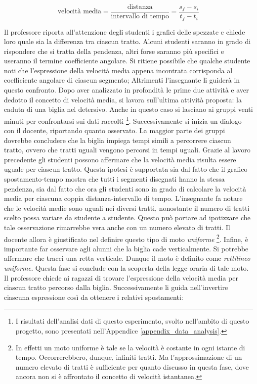 \documentclass{report} \usepackage[T1]{fontenc} \usepackage[italian]{babel}
\begin{document}
\begin{equation}
\textrm{velocità media} = \frac{\textrm{distanza}}{\textrm{intervallo di tempo}} =
\frac{s_f - s_i}{t_f - t_i}
\end{equation}

Il professore riporta all’attenzione degli studenti i grafici delle spezzate e
chiede loro quale sia la differenza tra ciascun tratto. Alcuni studenti saranno
in grado di rispondere che si tratta della pendenza, altri forse saranno più
specifici e useranno il termine coefficiente angolare. Si ritiene possibile che
qualche studente noti che l’espressione della velocità media appena incontrata
corrisponda al coefficiente angolare di ciascun segmento; Altrimenti
l’insegnante li guiderà in questo confronto.
Dopo aver analizzato in profondità le prime due attività e aver dedotto il
concetto di velocità media, si lavora sull’ultima attività proposta: la caduta
di una biglia nel detersivo. Anche in questo caso si lasciano ai gruppi venti minuti
per confrontarsi sui dati raccolti
\footnote{
          I risultati dell'analisi dati di questo esperimento, svolto
          nell'ambito di questo progetto, sono presentati nell'Appendice
          \ref{appendix_data_analysis}.
         }.
Successivamente si
inizia un dialogo con il docente, riportando quanto osservato. La maggior parte
dei gruppi dovrebbe concludere che la biglia impiega tempi simili a percorrere
ciascun tratto, ovvero che tratti uguali vengono percorsi in tempi uguali.
Grazie al lavoro precedente gli studenti possono affermare che la velocità
media risulta essere uguale per ciascun tratto. Questa ipotesi è supportata sia
dal fatto che il grafico spostamento-tempo mostra che tutti i segmenti disegnati
hanno la stessa pendenza,
sia dal fatto che ora gli studenti sono in grado di calcolare la velocità
media per ciascuna coppia distanza-intervallo di tempo.
L’insegnante fa notare che le velocità medie sono uguali nei
diversi tratti, nonostante il numero di tratti scelto possa variare da studente
a studente. Questo può portare ad ipotizzare che tale osservazione rimarrebbe
vera anche con un numero elevato di tratti. Il docente allora è giustificato
nel definire questo tipo di moto \emph{uniforme}
\footnote{
          In effetti un moto uniforme è
          tale se la velocità è costante in ogni istante di tempo. Occorrerebbero,
          dunque, infiniti tratti. Ma l’approssimazione di un numero elevato di tratti è
          sufficiente per quanto discusso in questa fase, dove ancora non si è affrontato
          il concetto di velocità istantanea.
         }.
Infine, è importante far osservare agli
alunni che la biglia cade verticalmente. Si potrebbe affermare che tracci una
retta verticale. Dunque il moto è definito come \emph{rettilineo uniforme}. Questa
fase si conclude con la scoperta della legge oraria di tale moto. Il professore
chiede ai ragazzi di trovare l’espressione della velocità media per ciascun
tratto percorso dalla biglia. Successivamente li guida nell’invertire ciascuna
espressione così da ottenere i relativi spostamenti:
\end{document}
